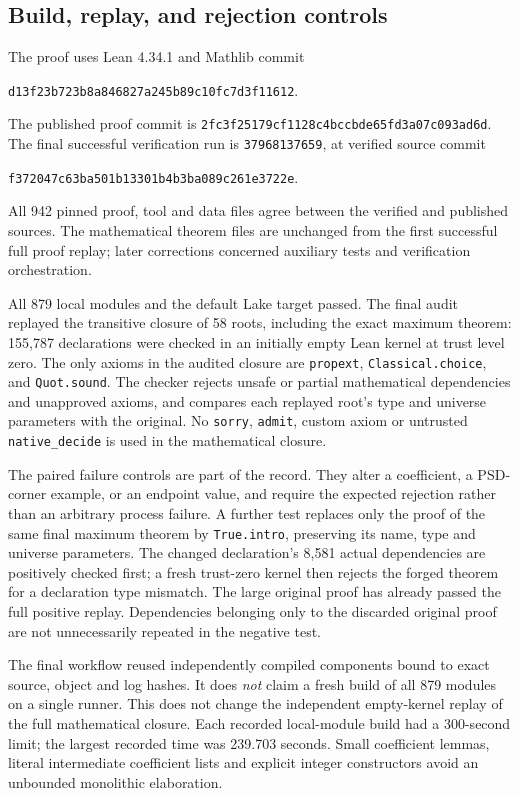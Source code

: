 \documentclass[11pt]{article}
\theoremstyle{remark}\newtheorem{remark}[theorem]{Remark}
\newcommand{\proofcommit}{\texttt{2fc3f25179cf1128c4bccbde65fd3a07c093ad6d}}
\begin{document}
\subsection{Build, replay, and rejection controls}
The proof uses Lean 4.34.1 and Mathlib commit
\begin{center}\small\texttt{d13f23b723b8a846827a245b89c10fc7d3f11612}.
\end{center}
The published proof commit is \proofcommit. The final successful verification run is \texttt{37968137659}, at verified source commit
\begin{center}\small\texttt{f372047c63ba501b13301b4b3ba089c261e3722e}.
\end{center}
All 942 pinned proof, tool and data files agree between the verified and published sources. The mathematical theorem files are unchanged from the first successful full proof replay; later corrections concerned auxiliary tests and verification orchestration.

All 879 local modules and the default Lake target passed. The final audit replayed the transitive closure of 58 roots, including the exact maximum theorem: 155,787 declarations were checked in an initially empty Lean kernel at trust level zero. The only axioms in the audited closure are \texttt{propext}, \texttt{Classical.choice}, and \texttt{Quot.sound}. The checker rejects unsafe or partial mathematical dependencies and unapproved axioms, and compares each replayed root's type and universe parameters with the original. No \texttt{sorry}, \texttt{admit}, custom axiom or untrusted \texttt{native\_decide} is used in the mathematical closure.

The paired failure controls are part of the record. They alter a coefficient, a PSD-corner example, or an endpoint value, and require the expected rejection rather than an arbitrary process failure. A further test replaces only the proof of the same final maximum theorem by \texttt{True.intro}, preserving its name, type and universe parameters. The changed declaration's 8,581 actual dependencies are positively checked first; a fresh trust-zero kernel then rejects the forged theorem for a declaration type mismatch. The large original proof has already passed the full positive replay. Dependencies belonging only to the discarded original proof are not unnecessarily repeated in the negative test.

The final workflow reused independently compiled components bound to exact source, object and log hashes. It does \emph{not} claim a fresh build of all 879 modules on a single runner. This does not change the independent empty-kernel replay of the full mathematical closure. Each recorded local-module build had a 300-second limit; the largest recorded time was 239.703 seconds. Small coefficient lemmas, literal intermediate coefficient lists and explicit integer constructors avoid an unbounded monolithic elaboration.
\end{document}
